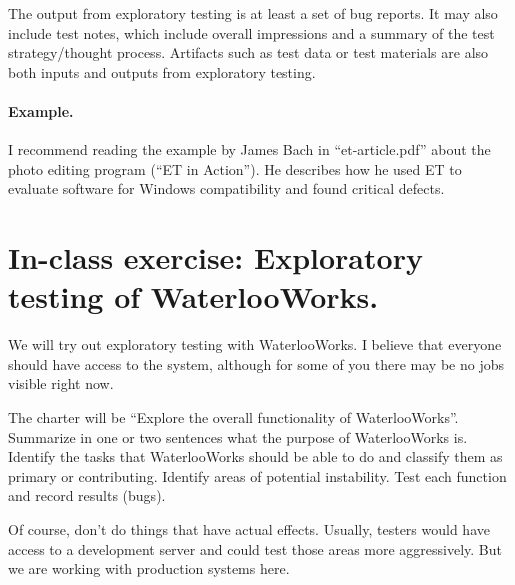 \documentclass[11pt]{article}
\begin{document}
The output from exploratory testing is at least a set of bug
reports. It may also include test notes, which include overall
impressions and a summary of the test strategy/thought
process. Artifacts such as test data or test materials are also both
inputs and outputs from exploratory testing.

\paragraph{Example.} I recommend reading the example by James Bach in ``et-article.pdf''
about the photo editing program (``ET in Action''). He describes how he used ET to evaluate
software for Windows compatibility and found critical defects.

\section*{In-class exercise: Exploratory testing of WaterlooWorks.}
We will try out exploratory testing with WaterlooWorks. I believe that everyone should
have access to the system, although for some of you there may be no jobs visible
right now. 

The charter will be ``Explore the overall functionality of WaterlooWorks''. Summarize
in one or two sentences what the purpose of WaterlooWorks is. Identify the tasks that
WaterlooWorks should be able to do and classify them as primary or contributing. Identify
areas of potential instability. Test each function and record results (bugs).

Of course, don't do things that have actual effects. Usually, testers would have access 
to a development server and could test those areas more aggressively. But we are working
with production systems here.
\end{document}
